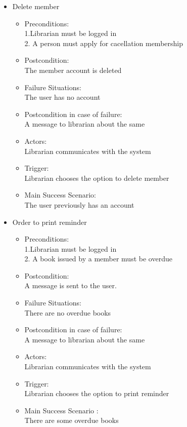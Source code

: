 \documentclass{article}
\begin{document}
\begin{enumerate}
\begin{itemize}
\item Delete member\\ 
 \begin{itemize}
  \item Preconditions:\\ 1.Librarian must be logged in\\ 2. A person must apply for cacellation membership\\ 
 \item Postcondition:\\ The member account is deleted\\ 
 \item Failure Situations: \\ The user has no account\\ 
 \item Postcondition in case of failure:\\ A message to librarian about the same\\ 
 \item Actors: \\ Librarian communicates with the system\\ 
 \item Trigger:\\  Librarian  chooses the option to delete member\\ 
 \item Main Success Scenario:\\  The user   previously has an account\\ 
 \end{itemize}
 
 \item Order to print reminder\\ 
 \begin{itemize}
  \item Preconditions:\\ 1.Librarian must be logged in\\ 2. A book issued by a member must be overdue\\ 
 \item Postcondition:\\ A message is sent to the user.\\ 
 \item Failure Situations:\\  There are no overdue books\\ 
 \item Postcondition in case of failure:\\ A message to librarian about the same\\ 
 \item Actors: \\ Librarian communicates with the system\\ 
 \item Trigger:\\  Librarian  chooses the option to print reminder\\ 
 \item Main Success Scenario :\\  There are some overdue books\\ 
 \end{itemize}


\end{itemize}
\end{enumerate}
\end{document}
